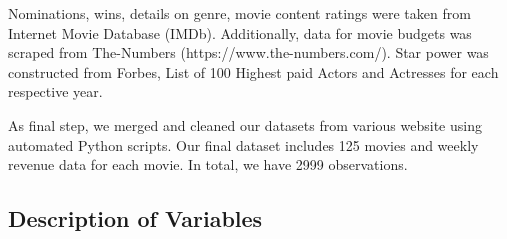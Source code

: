 \documentclass[11pt]{article} %
\begin{document}
Nominations, wins, details on genre, movie content ratings were taken from Internet Movie Database (IMDb). Additionally, data for movie budgets was scraped from The-Numbers (https://www.the-numbers.com/). Star power was constructed from Forbes, List of 100 Highest paid Actors and Actresses for each respective year. 

As final step, we merged and cleaned our datasets from various website using automated Python scripts. Our final dataset includes 125 movies and weekly revenue data for each movie. In total, we have 2999 observations. 


\subsection{Description of Variables}

\begin{table}[h]
\caption{Dependent Variable}
\label{tab:my-table}
\end{table}
\end{document}
